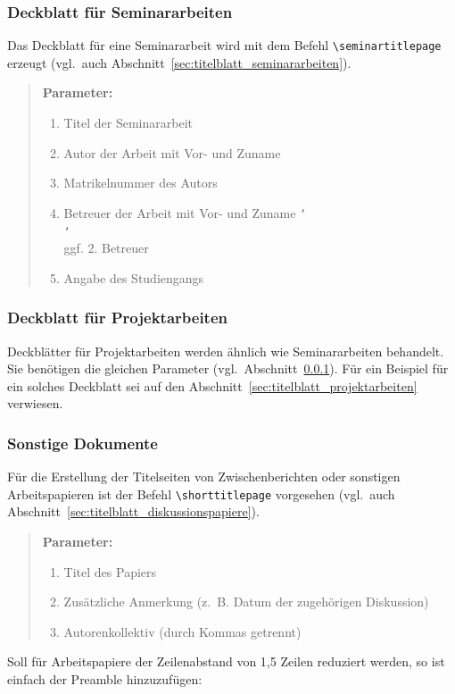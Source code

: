 \documentclass[english, trackchanges, hyperref, ngerman ,pdf, mp, mppdf]{wise}
\newcommand\code[1]{\texttt{#1}}
\newcommand\command[1]{\code{\textbackslash{}#1}}
\begin{document}
\subsubsection{Deckblatt für Seminararbeiten}\label{sec:deckblatt_seminararbeiten}

Das Deckblatt für eine Seminararbeit wird mit dem Befehl \command{seminartitlepage}
erzeugt (vgl.\ auch Abschnitt~\ref{sec:titelblatt_seminararbeiten}). 

\begin{quotation}
\noindent \textbf{Parameter:}
\begin{enumerate}
\item Titel der Seminararbeit
\item Autor der Arbeit mit Vor- und Zuname
\item Matrikelnummer des Autors
\item Betreuer der Arbeit mit Vor- und Zuname  {\tt\char`\\}{\tt\char`\\} ggf. 2. Betreuer
\item Angabe des Studiengangs
\end{enumerate}
\end{quotation}

\subsubsection{Deckblatt für Projektarbeiten}

Deckblätter für Projektarbeiten werden ähnlich wie Seminararbeiten
behandelt. Sie benötigen die gleichen Parameter (vgl.~Abschnitt~\ref{sec:deckblatt_seminararbeiten}).
Für ein Beispiel für ein solches Deckblatt sei auf den Abschnitt~\ref{sec:titelblatt_projektarbeiten}
verwiesen.


\subsubsection{Sonstige Dokumente}

Für die Erstellung der Titelseiten von Zwischenberichten oder sonstigen
Arbeitspapieren ist der Befehl \command{shorttitlepage}
vorgesehen (vgl.\ auch Abschnitt~\ref{sec:titelblatt_diskussionspapiere}). 

\begin{quotation}
\noindent \textbf{Parameter:}
\begin{enumerate}
\item Titel des Papiers
\item Zusätzliche Anmerkung (z.~B. Datum der zugehörigen Diskussion)
\item Autorenkollektiv (durch Kommas getrennt)
\end{enumerate}
\end{quotation}
Soll für Arbeitspapiere der Zeilenabstand von 1,5 Zeilen reduziert
werden, so ist einfach der Preamble hinzuzufügen: 
\end{document}
